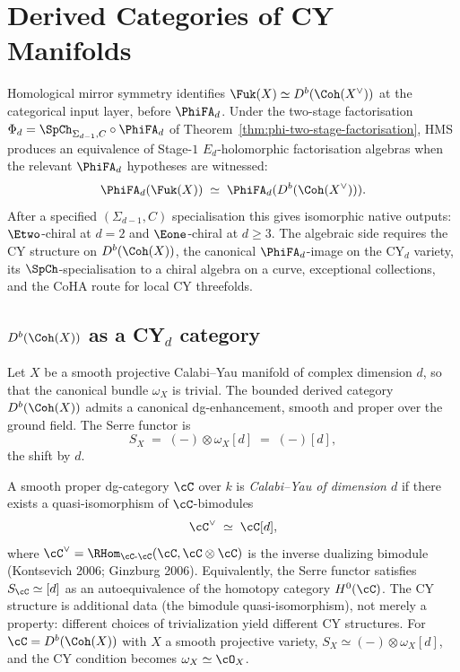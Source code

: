 \providecommand{\Mbar}{\overline{\mathcal{M}}}%

\chapter{Derived Categories of CY Manifolds}
\label{ch:derived-cy}

Homological mirror symmetry identifies $\Fuk(X) \simeq D^b(\Coh(X^\vee))$ at the categorical input layer, before $\PhiFA_d$. Under the two-stage factorisation $\Phi_d = \SpCh_{\Sigma_{d-1}, C} \circ \PhiFA_d$ of Theorem~\ref{thm:phi-two-stage-factorisation}, HMS produces an equivalence of Stage-$1$ $E_d$-holomorphic factorisation algebras when the relevant $\PhiFA_d$ hypotheses are witnessed:
\[
 \PhiFA_d(\Fuk(X)) \;\simeq\; \PhiFA_d(D^b(\Coh(X^\vee))).
\]
After a specified $(\Sigma_{d-1}, C)$ specialisation this gives isomorphic native outputs: $\Etwo$-chiral at $d=2$ and $\Eone$-chiral at $d\geq3$. The algebraic side requires the CY structure on $D^b(\Coh(X))$, the canonical $\PhiFA_d$-image on the CY$_d$ variety, its $\SpCh$-specialisation to a chiral algebra on a curve, exceptional collections, and the CoHA route for local CY threefolds.

\section{\texorpdfstring{$D^b(\Coh(X))$}{D-b(Coh(X))} as a CY\texorpdfstring{$_d$}{-d} category}
\label{sec:db-coh-cy}

Let $X$ be a smooth projective Calabi--Yau manifold of complex dimension $d$, so that the canonical bundle $\omega_X$ is trivial. The bounded derived category $D^b(\Coh(X))$ admits a canonical dg-enhancement, smooth and proper over the ground field. The Serre functor is
\[
 S_X \;=\; (-) \otimes \omega_X [d] \;=\; (-)[d],
\]
the shift by $d$.

\begin{definition}
\label{def:cy-d-category}
A smooth proper dg-category $\cC$ over $k$ is \emph{Calabi--Yau of dimension $d$} if there exists a quasi-isomorphism of $\cC$-bimodules
\[
 \cC^\vee \;\simeq\; \cC[d],
\]
where $\cC^\vee = \RHom_{\cC\text{-}\cC}(\cC, \cC \otimes \cC)$ is the inverse dualizing bimodule (Kontsevich 2006; Ginzburg 2006). Equivalently, the Serre functor satisfies $S_\cC \simeq [d]$ as an autoequivalence of the homotopy category $H^0(\cC)$. The CY structure is additional data (the bimodule quasi-isomorphism), not merely a property: different choices of trivialization yield different CY structures. For $\cC = D^b(\Coh(X))$ with $X$ a smooth projective variety, $S_X \simeq (-) \otimes \omega_X[d]$, and the CY condition becomes $\omega_X \simeq \cO_X$.
\end{definition}

